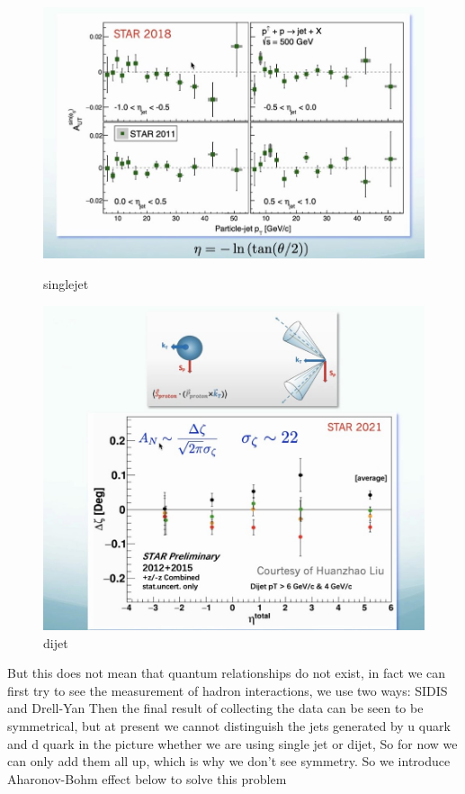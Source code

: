 \documentclass[12pt, a4paper, oneside]{article}
\begin{document}
\begin{spacing}{2.0}
\begin{figure}
    \begin{minipage}[t]{0.5\linewidth}
        \centering
        \includegraphics[scale=0.3]{alpha.jpg}
        \caption{singlejet}
        \label{fig:side:a}
      \end{minipage}%
      \begin{minipage}[t]{0.5\linewidth}
        \centering
        \includegraphics[scale=0.3]{dijet.jpg}
        \caption{dijet}
        \label{fig:side:b}
      \end{minipage}
 
\end{figure}
But this does not mean that quantum relationships do not exist, in fact we can first try to see the measurement of hadron interactions, we use two ways: SIDIS and Drell-Yan
Then the final result of collecting the data can be seen to be symmetrical, but at present we cannot distinguish the jets generated by u quark and d quark in the picture whether we are using single jet or dijet,
So for now we can only add them all up, which is why we don't see symmetry.
So we introduce Aharonov-Bohm effect below to solve this problem


\end{spacing}
\end{document}
